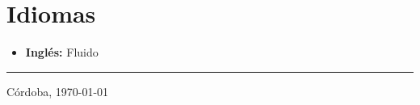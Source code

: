 \documentclass[a4paper]{article}
\begin{document}
\section{Idiomas}
\begin{itemize}
 \item \textbf{Ingl\'es:} Fluido
\end{itemize}


\vspace{2\baselineskip}

\begin{flushright}
\rule{7cm}{0.2mm}

 Córdoba,
 \today
\end{flushright}
\end{document}
